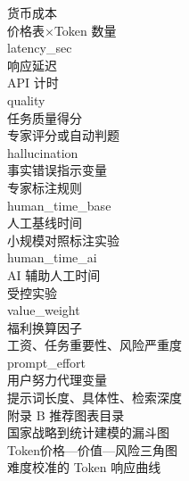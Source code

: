 货币成本\\

价格表×Token 数量\\

latency_sec\\

响应延迟\\

API 计时\\

quality\\

任务质量得分\\

专家评分或自动判题\\

hallucination\\

事实错误指示变量\\

专家标注规则\\

human_time_base\\

人工基线时间\\

小规模对照标注实验\\

human_time_ai\\

AI 辅助人工时间\\

受控实验\\

value_weight\\

福利换算因子\\

工资、任务重要性、风险严重度\\

prompt_effort\\

用户努力代理变量\\

提示词长度、具体性、检索深度\\

附录 B  推荐图表目录\\

国家战略到统计建模的漏斗图\\

Token价格—价值—风险三角图\\

难度校准的 Token 响应曲线\\

